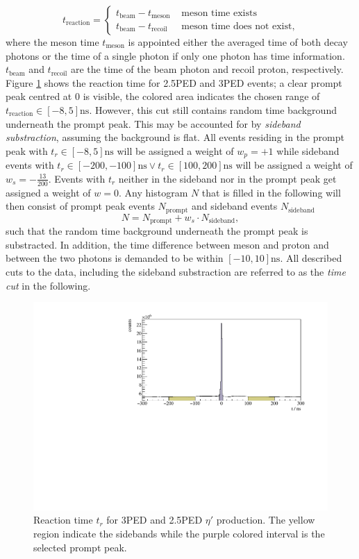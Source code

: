 \begin{equation}
	t_\text{reaction}=\begin{cases}
		t_\text{beam}-t_\text{meson} & \text{ meson time exists}\\
		t_\text{beam}-t_\text{recoil} & \text{ meson time does not exist},
	\end{cases}
\end{equation}
where the meson time $t_\text{meson}$ is appointed either the averaged time of both decay photons or the time of a single photon if only one photon has time information. $t_\text{beam}$ and $t_\text{recoil}$ are the time of the beam photon and recoil proton, respectively. Figure \ref{fig:time_r} shows the reaction time for 2.5PED and 3PED events; a clear prompt peak centred at 0 is visible, the colored area indicates the chosen range of $t_\text{reaction}\in[-8,5]\si{\nano\s}$. However, this cut still contains random time background underneath the prompt peak. This may be accounted for by \emph{sideband substraction}, assuming the background is flat. All events residing in the prompt peak with $t_r\in[-8,5]\si{\nano\s}$ will be assigned a weight of $w_p=+1$ while sideband events with $t_r\in[-200,-100]\si{\nano\s}\lor t_r\in[100,200]\si{\nano\s}$ will be assigned a weight of $w_s=-\frac{13}{200}$. Events with $t_r$ neither in the sideband nor in the prompt peak get assigned a weight of $w=0$. Any histogram $N$ that is filled in the following will then consist of prompt peak events $N_\text{prompt}$ and sideband events $N_\text{sideband}$ $$N=N_\text{prompt}+w_s\cdot N_\text{sideband},$$ such that the random time background underneath the prompt peak is substracted. In addition, the time difference between meson and proton and between the two photons is demanded to be within $[-10,10]\si{\nano\s}$. All described cuts to the data, including the sideband substraction are referred to as the \emph{time cut} in the following.

\begin{figure}[htbp]
	\centering
	\includegraphics[width=\linewidth]{../figs/hydrogen/time/reaction_time.pdf}
	\caption{Reaction time $t_r$ for 3PED and 2.5PED $\eta'$ production. The yellow region indicate the sidebands while the purple colored interval is the selected prompt peak.}
	\label{fig:time_r}
\end{figure} 

